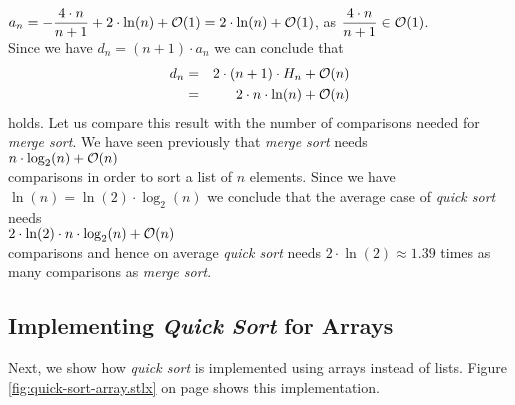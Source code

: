\\[0.2cm]
\hspace*{1.3cm}
$\displaystyle a_n = - \frac{4 \cdot n}{n+1}  + 2 \cdot \ln(n) + \mathcal{O}(1) =  2 \cdot \ln(n) + \mathcal{O}(1)$,
\quad as \quad $\displaystyle \frac{4 \cdot n}{n+1} \in \mathcal{O}(1)$.
\\[0.2cm]
Since we have $d_n = (n+1) \cdot a_{n}$ we can conclude that
\begin{eqnarray*}  
 d_n & = &  2 \cdot(n+1) \cdot H_n + \mathcal{O}(n) \\
     & = & 2 \cdot n \cdot \ln(n) + \mathcal{O}(n)
\end{eqnarray*}
holds.  Let us compare this result with the number of comparisons needed for \emph{merge sort}.
We have seen previously that \emph{merge sort} needs
\\[0.2cm]
\hspace*{1.3cm} $n \cdot \log_2(n) + \mathcal{O}(n)$ \\[0.2cm]
comparisons in order to sort a list of $n$ elements.  Since we have $\ln(n) = \ln(2) \cdot \log_2(n)$
we conclude that the average case of \emph{quick sort} needs
 \\[0.2cm]
\hspace*{1.3cm} $2 \cdot \ln(2) \cdot n \cdot \log_2(n) + \mathcal{O}(n)$ \\[0.2cm]
comparisons and hence on average \emph{quick sort} needs  $2 \cdot \ln(2) \approx 1.39$ times as many comparisons as
\emph{merge sort}.  


\subsection{Implementing \emph{Quick Sort} for Arrays}
Next, we show how \emph{quick sort}  is implemented using arrays instead of lists.  Figure
\ref{fig:quick-sort-array.stlx} on page \pageref{fig:quick-sort-array.stlx} shows this implementation. 

